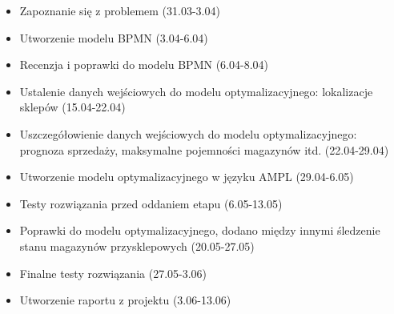 \documentclass{article}
\begin{document}
\begin{itemize}
   \item Zapoznanie się z problemem (31.03-3.04)
   \item Utworzenie modelu BPMN (3.04-6.04)
   \item Recenzja i poprawki do modelu BPMN (6.04-8.04)
   \item Ustalenie danych wejściowych do modelu optymalizacyjnego: lokalizacje sklepów (15.04-22.04)
   \item Uszczegółowienie danych wejściowych do modelu optymalizacyjnego: prognoza sprzedaży, maksymalne pojemności magazynów itd. (22.04-29.04)
   \item Utworzenie modelu optymalizacyjnego w języku AMPL (29.04-6.05)
   \item Testy rozwiązania przed oddaniem etapu (6.05-13.05)
   \item Poprawki do modelu optymalizacyjnego, dodano między innymi śledzenie stanu magazynów przysklepowych (20.05-27.05)
   \item Finalne testy rozwiązania (27.05-3.06)
   \item Utworzenie raportu z projektu (3.06-13.06)
 \end{itemize}
\end{document}
